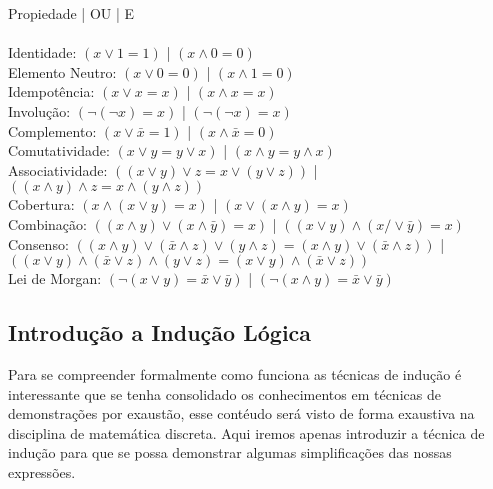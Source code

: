 \documentclass[12pt, onecolumn]{article}
\begin{document}
			Propiedade | OU | E \\ 
	\\
	Identidade: $(x \lor 1 = 1)$ | $(x \land 0 = 0)$ \\
	\newline
	Elemento Neutro: $(x \lor 0 = 0)$ | $(x \land 1 = 0)$ \\
	\newline
	Idempotência: $(x \lor x = x)$ | $(x \land x = x)$ \\ 
	\newline
	Involução: $(\lnot(\lnot x) = x)$ | $(\lnot(\lnot x) = x)$ \\ 
	\newline
	Complemento: $(x \lor \bar{x} = 1)$ | $(x \land \bar{x} = 0)$ \\ 
	\newline
	Comutatividade: $(x \lor y = y \lor x)$ | $(x \land y = y \land x)$ \\
	\newline
	Associatividade: $((x \lor y) \lor z = x \lor (y \lor z))$ | 
	$((x \land y) \land z = x \land (y \land z))$ \\
	\newline
	Cobertura: $(x \land (x \lor y) = x)$ | $(x \lor (x \land y) = x)$ \\
	\newline
	Combinação: $((x \land y) \lor (x \land \bar{y}) = x)$ | 
	$((x \lor y) \land (x /\lor \bar{y}) = x)$ \\
	\newline
	Consenso: $((x \land y) \lor (\bar{x} \land z) \lor (y \land z) = 
	(x \land y) \lor (\bar{x} \land z))$ | 
	$((x \lor y) \land (\bar{x} \lor z) \land (y \lor z) = 
	(x \lor y) \land (\bar{x} \lor z))$ \\
	\newline
	Lei de Morgan: $(\lnot(x \lor y) = \bar{x} \lor \bar{y})$ | 
	$(\lnot(x \land y) = \bar{x} \lor \bar{y})$ \\

		\subsection{\centering Introdução a Indução Lógica}
	
	Para se compreender formalmente como funciona as técnicas de indução
	é interessante que se tenha consolidado os conhecimentos em técnicas 
	de demonstrações por exaustão, esse contéudo será visto de forma exaustiva 
	na disciplina de matemática discreta. Aqui iremos apenas introduzir a 
	técnica de indução para que se possa demonstrar algumas simplificações 
	das nossas expressões.\\
		
\end{document}

